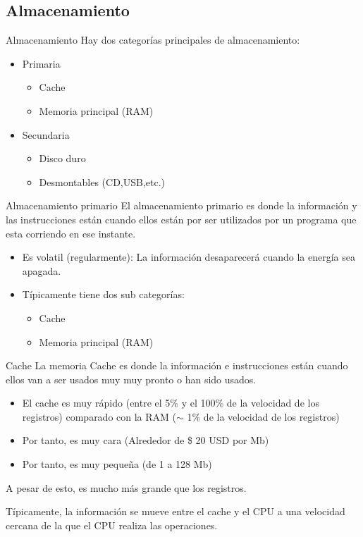 \documentclass[11pt]{beamer}
\begin{document}
	\subsection{Almacenamiento}
		\begin{frame}{Almacenamiento}
			Hay dos categorías principales de almacenamiento:
			\begin{itemize}
				\item Primaria
				\begin{itemize}
					\item Cache
					\item Memoria principal (RAM)
				\end{itemize}
				\item Secundaria
				\begin{itemize}
					\item Disco duro
					\item Desmontables (CD,USB,etc.)
				\end{itemize}
			\end{itemize}
		\end{frame}
		\begin{frame}{Almacenamiento primario}
			El almacenamiento primario es donde la información y las instrucciones están cuando ellos están por ser utilizados por un programa que esta corriendo en ese instante.
			\begin{itemize}
				\item Es volatil (regularmente): La información desaparecerá cuando la energía sea apagada.
				\item Típicamente tiene dos sub categorías:
				\begin{itemize}
					\item Cache
					\item Memoria principal (RAM)
				\end{itemize}
			\end{itemize}
		\end{frame}
		\begin{frame}{Cache}
			La memoria Cache es donde la información e instrucciones están cuando ellos van a ser usados muy muy pronto o han sido usados.
			\begin{itemize}
				\item El cache es muy rápido (entre el 5\% y el 100\% de la velocidad de los registros) comparado con la RAM ($\sim$ 1\% de la velocidad de los registros)
				\item Por tanto, es muy cara (Alrededor de \$ 20 USD por Mb)
				\item Por tanto, es muy pequeña (de 1 a 128 Mb)
			\end{itemize}
			A pesar de esto, es mucho más grande que los registros.
			
			Típicamente, la información se mueve entre el cache y el CPU a una velocidad cercana de la que el CPU realiza las operaciones.
		\end{frame}
\end{document}

